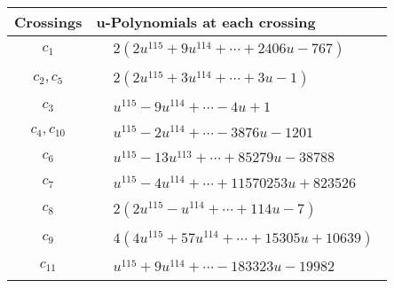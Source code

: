 \documentclass[1p]{elsarticle_modified}
\theoremstyle{definition}
\begin{document}
\begin{tabular}{m{50pt}|m{274pt}}
Crossings & \hspace{64pt}u-Polynomials at each crossing \\
\hline $$\begin{aligned}c_{1}\end{aligned}$$&$\begin{aligned}
&2(2 u^{115}+9 u^{114}+\cdots+2406 u-767)
\end{aligned}$\\
\hline $$\begin{aligned}c_{2},c_{5}\end{aligned}$$&$\begin{aligned}
&2(2 u^{115}+3 u^{114}+\cdots+3 u-1)
\end{aligned}$\\
\hline $$\begin{aligned}c_{3}\end{aligned}$$&$\begin{aligned}
&u^{115}-9 u^{114}+\cdots-4 u+1
\end{aligned}$\\
\hline $$\begin{aligned}c_{4},c_{10}\end{aligned}$$&$\begin{aligned}
&u^{115}-2 u^{114}+\cdots-3876 u-1201
\end{aligned}$\\
\hline $$\begin{aligned}c_{6}\end{aligned}$$&$\begin{aligned}
&u^{115}-13 u^{113}+\cdots+85279 u-38788
\end{aligned}$\\
\hline $$\begin{aligned}c_{7}\end{aligned}$$&$\begin{aligned}
&u^{115}-4 u^{114}+\cdots+11570253 u+823526
\end{aligned}$\\
\hline $$\begin{aligned}c_{8}\end{aligned}$$&$\begin{aligned}
&2(2 u^{115}- u^{114}+\cdots+114 u-7)
\end{aligned}$\\
\hline $$\begin{aligned}c_{9}\end{aligned}$$&$\begin{aligned}
&4(4 u^{115}+57 u^{114}+\cdots+15305 u+10639)
\end{aligned}$\\
\hline $$\begin{aligned}c_{11}\end{aligned}$$&$\begin{aligned}
&u^{115}+9 u^{114}+\cdots-183323 u-19982
\end{aligned}$\\
\hline
\end{tabular}\\~\\
\end{document}
